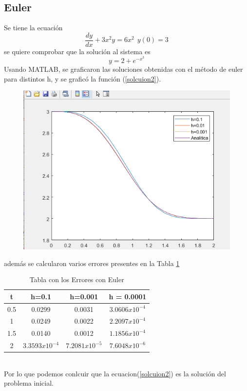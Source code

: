\documentclass[12pt]{article}
\begin{document}
\subsection{Euler}
Se tiene la ecuación $$\frac{dy}{dx}+3x^2y=6x^2~~y(0)=3$$
se quiere comprobar que la solución al sistema es
\begin{equation}
y=2+e^{-x^3}
\label{solcuion2}
\end{equation} 
Usando MATLAB, se graficaron las soluciones obtenidas con el método de euler para distintos h, y se graficó la función (\ref{solcuion2}).
\begin{figure}[h]
	\centering
	\caption{}
	\includegraphics[scale=0.45]{graf3.png}
	\label{graf3}
\end{figure}
\newpage
además  se calcularon varios errores presentes en la Tabla \ref{table3}
\begin{table}[h]
	\centering
	\begin{tabular}{|c|c|c|c|}
		\hline
		t & h=0.1 & h=0.001 & h = 0.0001 \\
		\hline
		0.5&0.0299&0.0031&$3.0606x10^{-4}$\\
		\hline
		1&0.0249&0.0022&$2.2097x10^{-4}$\\
		\hline
		1.5&0.0140&0.0012&$1.1856x10^{-4}$\\
		\hline
		2&$3.3593x10^{-4}$&$7.2081x10^{-5}$&$7.6048x10^{-6}$\\
		\hline
	\end{tabular}
	\caption{Tabla con los Errores con Euler}
	\label{table3}
\end{table}\\
Por lo que podemos conlcuir que la ecuacion(\ref{solcuion2}) es la solución del problema inicial.
\end{document}
